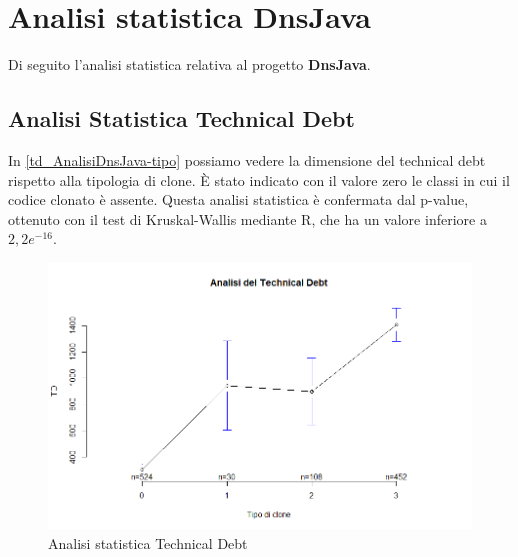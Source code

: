 \newpage
\section{Analisi statistica DnsJava}
Di seguito l'analisi statistica relativa al progetto \textbf{DnsJava}.

\subsection{Analisi Statistica Technical Debt}
In \autoref{td_AnalisiDnsJava-tipo} possiamo vedere la dimensione del technical debt rispetto alla tipologia di clone. È stato indicato con il valore zero le classi in cui il codice clonato è assente. Questa analisi statistica è confermata dal p-value, ottenuto con il test di Kruskal-Wallis mediante R, che ha un valore inferiore a $2,2 e^{-16}$.
\begin{figure}[htbp]
	\centering
	\includegraphics[scale=0.5]{analisi_R/AnalisiDnsJava/1-gplot-td-type.png}
\caption{Analisi statistica Technical Debt}
\label{td_AnalisiDnsJava-tipo}
\end{figure}

